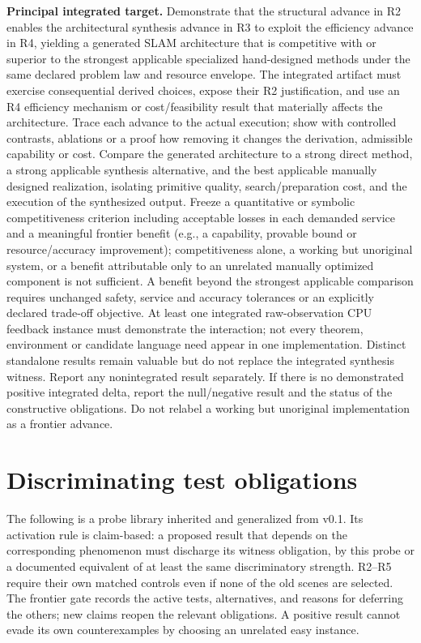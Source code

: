 \documentclass[11pt,letterpaper]{article}
\begin{document}
\textbf{Principal integrated target.} Demonstrate that the structural advance in R2 enables the architectural synthesis advance in R3 to exploit the efficiency advance in R4, yielding a generated SLAM architecture that is competitive with or superior to the strongest applicable specialized hand-designed methods under the same declared problem law and resource envelope. The integrated artifact must exercise consequential derived choices, expose their R2 justification, and use an R4 efficiency mechanism or cost/feasibility result that materially affects the architecture. Trace each advance to the actual execution; show with controlled contrasts, ablations or a proof how removing it changes the derivation, admissible capability or cost. Compare the generated architecture to a strong direct method, a strong applicable synthesis alternative, and the best applicable manually designed realization, isolating primitive quality, search/preparation cost, and the execution of the synthesized output. Freeze a quantitative or symbolic competitiveness criterion including acceptable losses in each demanded service and a meaningful frontier benefit (e.g., a capability, provable bound or resource/accuracy improvement); competitiveness alone, a working but unoriginal system, or a benefit attributable only to an unrelated manually optimized component is not sufficient. A benefit beyond the strongest applicable comparison requires unchanged safety, service and accuracy tolerances or an explicitly declared trade-off objective. At least one integrated raw-observation CPU feedback instance must demonstrate the interaction; not every theorem, environment or candidate language need appear in one implementation. Distinct standalone results remain valuable but do not replace the integrated synthesis witness. Report any nonintegrated result separately. If there is no demonstrated positive integrated delta, report the null/negative result and the status of the constructive obligations. Do not relabel a working but unoriginal implementation as a frontier advance.

\section{Discriminating test obligations}\label{sec:probes}
The following is a probe library inherited and generalized from v0.1. Its activation rule is claim-based: a proposed result that depends on the corresponding phenomenon must discharge its witness obligation, by this probe or a documented equivalent of at least the same discriminatory strength. R2--R5 require their own matched controls even if none of the old scenes are selected. The frontier gate records the active tests, alternatives, and reasons for deferring the others; new claims reopen the relevant obligations. A positive result cannot evade its own counterexamples by choosing an unrelated easy instance.
\end{document}
